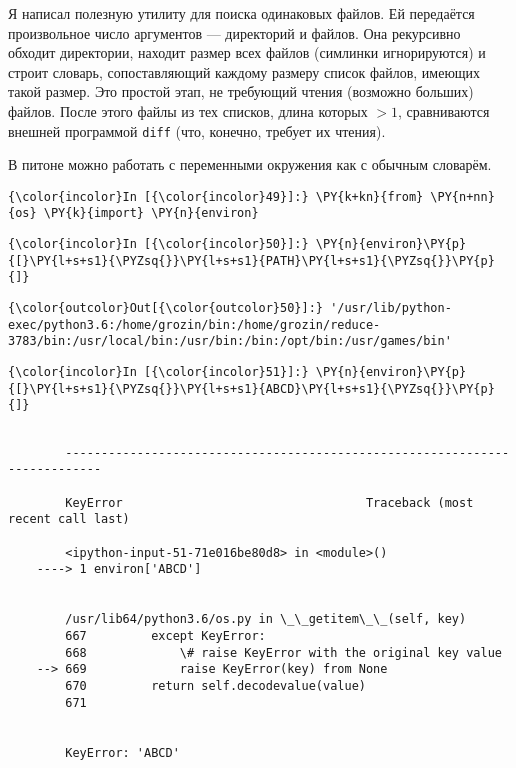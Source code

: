     Я написал полезную утилиту для поиска одинаковых файлов. Ей передаётся
произвольное число аргументов --- директорий и файлов. Она рекурсивно
обходит директории, находит размер всех файлов (симлинки игнорируются) и
строит словарь, сопоставляющий каждому размеру список файлов, имеющих
такой размер. Это простой этап, не требующий чтения (возможно больших)
файлов. После этого файлы из тех списков, длина которых \(>1\),
сравниваются внешней программой \texttt{diff} (что, конечно, требует их
чтения).

В питоне можно работать с переменными окружения как с обычным словарём.

    \begin{Verbatim}[commandchars=\\\{\}]
{\color{incolor}In [{\color{incolor}49}]:} \PY{k+kn}{from} \PY{n+nn}{os} \PY{k}{import} \PY{n}{environ}
\end{Verbatim}

    \begin{Verbatim}[commandchars=\\\{\}]
{\color{incolor}In [{\color{incolor}50}]:} \PY{n}{environ}\PY{p}{[}\PY{l+s+s1}{\PYZsq{}}\PY{l+s+s1}{PATH}\PY{l+s+s1}{\PYZsq{}}\PY{p}{]}
\end{Verbatim}

            \begin{Verbatim}[commandchars=\\\{\}]
{\color{outcolor}Out[{\color{outcolor}50}]:} '/usr/lib/python-exec/python3.6:/home/grozin/bin:/home/grozin/reduce-3783/bin:/usr/local/bin:/usr/bin:/bin:/opt/bin:/usr/games/bin'
\end{Verbatim}
        
    \begin{Verbatim}[commandchars=\\\{\}]
{\color{incolor}In [{\color{incolor}51}]:} \PY{n}{environ}\PY{p}{[}\PY{l+s+s1}{\PYZsq{}}\PY{l+s+s1}{ABCD}\PY{l+s+s1}{\PYZsq{}}\PY{p}{]}
\end{Verbatim}

    \begin{Verbatim}[commandchars=\\\{\}]

        ---------------------------------------------------------------------------

        KeyError                                  Traceback (most recent call last)

        <ipython-input-51-71e016be80d8> in <module>()
    ----> 1 environ['ABCD']
    

        /usr/lib64/python3.6/os.py in \_\_getitem\_\_(self, key)
        667         except KeyError:
        668             \# raise KeyError with the original key value
    --> 669             raise KeyError(key) from None
        670         return self.decodevalue(value)
        671 


        KeyError: 'ABCD'

    \end{Verbatim}

